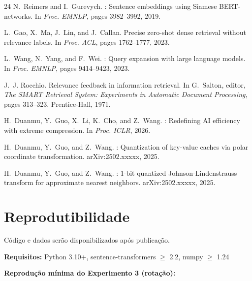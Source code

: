 \documentclass{article}
\begin{document}
\begin{thebibliography}{24}
N.~Reimers and I.~Gurevych.
: Sentence embeddings using {S}iamese {BERT}-networks.
\newblock In \emph{Proc. EMNLP}, pages 3982--3992, 2019.

L.~Gao, X.~Ma, J.~Lin, and J.~Callan.
\newblock Precise zero-shot dense retrieval without relevance labels.
\newblock In \emph{Proc. ACL}, pages 1762--1777, 2023.

L.~Wang, N.~Yang, and F.~Wei.
: Query expansion with large language models.
\newblock In \emph{Proc. EMNLP}, pages 9414--9423, 2023.

J.~J. Rocchio.
\newblock Relevance feedback in information retrieval.
\newblock In G.~Salton, editor, \emph{The {SMART} Retrieval System: Experiments in Automatic Document Processing}, pages 313--323. Prentice-Hall, 1971.

H.~Duanmu, Y.~Guo, X.~Li, K.~Cho, and Z.~Wang.
: Redefining {AI} efficiency with extreme compression.
\newblock In \emph{Proc. ICLR}, 2026.

H.~Duanmu, Y.~Guo, and Z.~Wang.
: Quantization of key-value caches via polar coordinate transformation.
\newblock arXiv:2502.xxxxx, 2025.

H.~Duanmu, Y.~Guo, and Z.~Wang.
: 1-bit quantized {Johnson-Lindenstrauss} transform for approximate nearest neighbors.
\newblock arXiv:2502.xxxxx, 2025.

\end{thebibliography}

\appendix

\section{Reprodutibilidade}

Código e dados serão disponibilizados após publicação.

\textbf{Requisitos:} Python 3.10+, sentence-transformers $\geq$ 2.2, numpy $\geq$ 1.24

\textbf{Reprodução mínima do Experimento 3 (rotação):}
\end{document}
